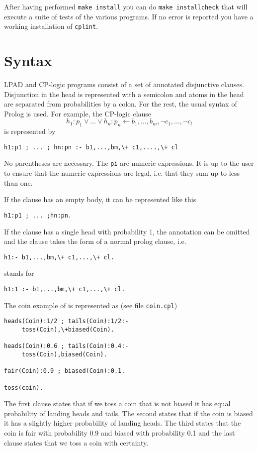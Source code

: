 \documentclass[a4paper,10pt]{article}
\begin{document}
After having performed \texttt{make install} you can do \texttt{make installcheck} that will execute a suite of tests of the various programs. If no error is reported you have a working installation of \texttt{cplint}.


\section{Syntax}

LPAD and CP-logic programs consist of a set of annotated disjunctive clauses.
Disjunction in the head is represented with a semicolon and atoms in the head are separated from probabilities by a colon. For the rest, the usual syntax of Prolog is used.
For example, the  CP-logic clause
$$h_1:p_1\vee \ldots \vee h_n:p_n\leftarrow b_1,\dots,b_m ,\neg c_1,\ldots,\neg c_l$$
is represented by
\begin{verbatim}
h1:p1 ; ... ; hn:pn :- b1,...,bm,\+ c1,....,\+ cl
\end{verbatim}
 No parentheses are necessary. The \texttt{pi} are numeric expressions. It is up to the user to ensure that the numeric expressions are legal, i.e. that they sum up to less than one.

If the clause has an empty body, it can be represented like this
\begin{verbatim}
h1:p1 ; ... ;hn:pn.
\end{verbatim}
If the clause has a single head with probability 1, the annotation can be omitted and the clause takes the form of a normal prolog clause, i.e. 
\begin{verbatim}
h1:- b1,...,bm,\+ c1,...,\+ cl.
\end{verbatim}
stands for 
\begin{verbatim}
h1:1 :- b1,...,bm,\+ c1,...,\+ cl.
\end{verbatim}

The coin example of  \cite{VenVer04-ICLP04-IC} is represented as (see file \texttt{coin.cpl})
\begin{verbatim}
heads(Coin):1/2 ; tails(Coin):1/2:- 
     toss(Coin),\+biased(Coin).

heads(Coin):0.6 ; tails(Coin):0.4:- 
     toss(Coin),biased(Coin).

fair(Coin):0.9 ; biased(Coin):0.1.

toss(coin).
\end{verbatim}
The first clause states that if we toss a coin that is not biased it has equal probability of landing heads and tails. The second states that if the coin is biased it has a slightly higher probability of landing heads. The third states that the coin is fair with probability 0.9 and biased with probability 0.1 and the last clause states that we toss a coin with certainty.
\end{document}

